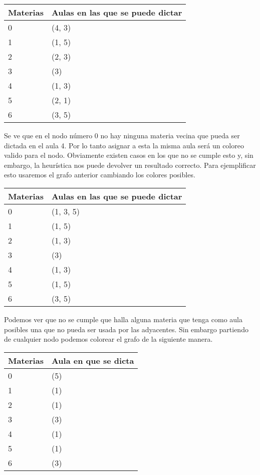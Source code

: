 \begin{table}[H]
\begin{center}
\begin{tabular}{|l|l|}
\hline
Materias & Aulas en las que se puede dictar \\
\hline \hline
0 & (4, 3) \\ \hline
1 & (1, 5) \\ \hline
2 & (2, 3) \\ \hline
3 & (3) \\ \hline
4 & (1, 3) \\ \hline
5 & (2, 1) \\ \hline
6 & (3, 5) \\ \hline
\end{tabular}
\end{center}
\end{table}

Se ve que en el nodo número 0 no hay ninguna materia vecina que pueda ser dictada en el aula 4. Por lo tanto asignar a esta la misma aula será un coloreo valido para el nodo.
Obviamente existen casos en los que no se cumple esto y, sin embargo, la heurística nos puede devolver un resultado correcto. Para ejemplificar esto usaremos el grafo anterior
cambiando los colores posibles.

\begin{table}[H]
\begin{center}
\begin{tabular}{|l|l|}
\hline
Materias & Aulas en las que se puede dictar \\
\hline \hline
0 & (1, 3, 5) \\ \hline
1 & (1, 5) \\ \hline
2 & (1, 3) \\ \hline
3 & (3) \\ \hline
4 & (1, 3) \\ \hline
5 & (1, 5) \\ \hline
6 & (3, 5) \\ \hline
\end{tabular}
\end{center}
\end{table}

Podemos ver que no se cumple que halla alguna materia que tenga como aula posibles una que no pueda ser usada por las adyacentes. Sin embargo partiendo de cualquier nodo 
podemos colorear el grafo de la siguiente manera.

\begin{table}[H]
\begin{center}
\begin{tabular}{|l|l|}
\hline
Materias & Aula en que se dicta \\
\hline \hline
0 & (5) \\ \hline
1 & (1) \\ \hline
2 & (1) \\ \hline
3 & (3) \\ \hline
4 & (1) \\ \hline
5 & (1) \\ \hline
6 & (3) \\ \hline
\end{tabular}
\end{center}
\end{table}

